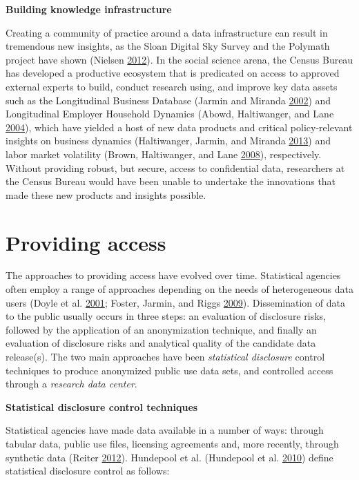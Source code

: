 \documentclass[]{krantz}
\begin{document}
\textbf{Building knowledge infrastructure}

Creating a community of practice around a data infrastructure can result
in tremendous new insights, as the Sloan Digital Sky Survey and the
Polymath project have shown (Nielsen
\protect\hyperlink{ref-nielsen2012reinventing}{2012}). In the social
science arena, the Census Bureau has developed a productive ecosystem
that is predicated on access to approved external experts to build,
conduct research using, and improve key data assets such as the
Longitudinal Business Database (Jarmin and Miranda
\protect\hyperlink{ref-jarmin2002longitudinal}{2002}) and Longitudinal
Employer Household Dynamics (Abowd, Haltiwanger, and Lane
\protect\hyperlink{ref-abowd2004integrated}{2004}), which have yielded a
host of new data products and critical policy-relevant insights on
business dynamics (Haltiwanger, Jarmin, and Miranda
\protect\hyperlink{ref-haltiwanger2013creates}{2013}) and labor market
volatility (Brown, Haltiwanger, and Lane
\protect\hyperlink{ref-brown2008economic}{2008}), respectively. Without
providing robust, but secure, access to confidential data, researchers
at the Census Bureau would have been unable to undertake the innovations
that made these new products and insights possible.

\section{Providing access}\label{providing-access}

The approaches to providing access have evolved over time. Statistical
agencies often employ a range of approaches depending on the needs of
heterogeneous data users (Doyle et al.
\protect\hyperlink{ref-doyle2001confidentiality}{2001}; Foster, Jarmin,
and Riggs \protect\hyperlink{ref-foster2009resolving}{2009}).
Dissemination of data to the public usually occurs in three steps: an
evaluation of disclosure risks, followed by the application of an
anonymization technique, and finally an evaluation of disclosure risks
and analytical quality of the candidate data release(s). The two main
approaches have been \emph{statistical disclosure} control techniques to
produce anonymized public use data sets, and controlled access through a
\emph{research data center}.

\textbf{Statistical disclosure control techniques}

Statistical agencies have made data available in a number of ways:
through tabular data, public use files, licensing agreements and, more
recently, through synthetic data (Reiter
\protect\hyperlink{ref-reiter2012statistical}{2012}). Hundepool et al.
(Hundepool et al. \protect\hyperlink{ref-hundepool2010handbook}{2010})
define statistical disclosure control as follows:
\end{document}

